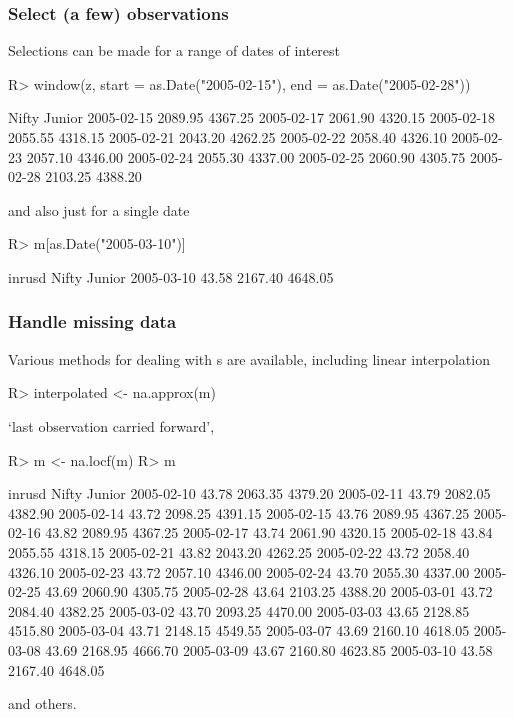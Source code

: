 \documentclass{Z}
\newcommand{\mysection}[1]{\subsubsection[#1]{\textbf{#1}}}
\begin{document}
\mysection{Select (a few) observations}

Selections can be made for a range of dates of interest
\begin{Schunk}
\begin{Sinput}
R> window(z, start = as.Date("2005-02-15"), end = as.Date("2005-02-28"))
\end{Sinput}
\begin{Soutput}
           Nifty   Junior 
2005-02-15 2089.95 4367.25
2005-02-17 2061.90 4320.15
2005-02-18 2055.55 4318.15
2005-02-21 2043.20 4262.25
2005-02-22 2058.40 4326.10
2005-02-23 2057.10 4346.00
2005-02-24 2055.30 4337.00
2005-02-25 2060.90 4305.75
2005-02-28 2103.25 4388.20
\end{Soutput}
\end{Schunk}
and also just for a single date
\begin{Schunk}
\begin{Sinput}
R> m[as.Date("2005-03-10")]
\end{Sinput}
\begin{Soutput}
           inrusd  Nifty   Junior 
2005-03-10   43.58 2167.40 4648.05
\end{Soutput}
\end{Schunk}

\mysection{Handle missing data}

Various methods for dealing with s are available, including
linear interpolation
\begin{Schunk}
\begin{Sinput}
R> interpolated <- na.approx(m)
\end{Sinput}
\end{Schunk}
`last observation carried forward',
\begin{Schunk}
\begin{Sinput}
R> m <- na.locf(m)
R> m
\end{Sinput}
\begin{Soutput}
           inrusd  Nifty   Junior 
2005-02-10   43.78 2063.35 4379.20
2005-02-11   43.79 2082.05 4382.90
2005-02-14   43.72 2098.25 4391.15
2005-02-15   43.76 2089.95 4367.25
2005-02-16   43.82 2089.95 4367.25
2005-02-17   43.74 2061.90 4320.15
2005-02-18   43.84 2055.55 4318.15
2005-02-21   43.82 2043.20 4262.25
2005-02-22   43.72 2058.40 4326.10
2005-02-23   43.72 2057.10 4346.00
2005-02-24   43.70 2055.30 4337.00
2005-02-25   43.69 2060.90 4305.75
2005-02-28   43.64 2103.25 4388.20
2005-03-01   43.72 2084.40 4382.25
2005-03-02   43.70 2093.25 4470.00
2005-03-03   43.65 2128.85 4515.80
2005-03-04   43.71 2148.15 4549.55
2005-03-07   43.69 2160.10 4618.05
2005-03-08   43.69 2168.95 4666.70
2005-03-09   43.67 2160.80 4623.85
2005-03-10   43.58 2167.40 4648.05
\end{Soutput}
\end{Schunk}
and others.
\end{document}
